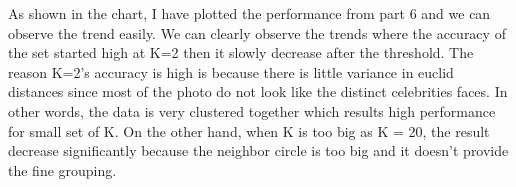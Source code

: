 \documentclass[12pt]{article} %
\begin{document}
As shown in the chart, I have plotted the performance from part 6 and we can observe the trend easily. We can clearly observe the trends where the accuracy of the set started high at K=2 then it slowly decrease after the threshold. The reason K=2’s accuracy is high is because there is little variance in euclid distances since most of the photo do not look like the distinct celebrities faces. In other words, the data is very clustered together which results high performance for small set of K. On the other hand, when K is too big as K = 20, the result decrease significantly because the neighbor circle is too big and it doesn’t provide the fine grouping.
\end{document}
